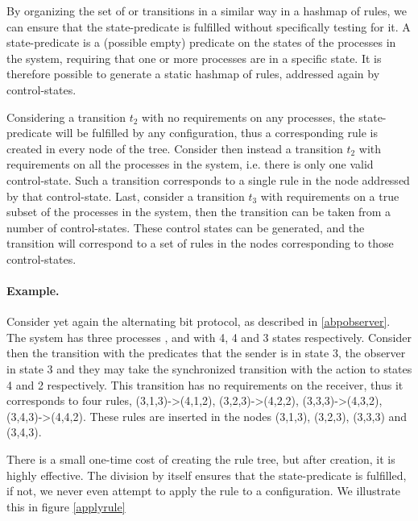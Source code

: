 By organizing the set of  or transitions in a similar way in a hashmap of rules, we can ensure that the state-predicate is fulfilled without specifically testing for it. A state-predicate is a (possible empty) predicate on the states of the processes in the system, requiring that one or more processes are in a specific state. It is therefore possible to generate a static hashmap of rules, addressed again by control-states.

Considering a transition $t_2$ with no requirements on any processes, the state-predicate will be fulfilled by any configuration, thus a corresponding rule is created in every node of the tree. Consider then instead a transition $t_2$ with requirements on all the processes in the system, i.e. there is only one valid control-state. Such a transition corresponds to a single rule in the node addressed by that control-state. Last, consider a transition $t_3$ with requirements on a true subset of the processes in the system, then the transition can be taken from a number of control-states. These control states can be generated, and the transition will correspond to a set of rules in the nodes corresponding to those control-states.

\paragraph{Example.} Consider yet again the alternating bit protocol, as described in \ref{abpobserver}. The system has three processes ,  and  with 4, 4 and 3 states respectively. Consider then the transition with the predicates that the sender is in state 3, the observer in state 3 and they may take the synchronized transition with the action  to states 4 and 2 respectively. This transition has no requirements on the receiver, thus it corresponds to four rules, (3,1,3)->(4,1,2), (3,2,3)->(4,2,2), (3,3,3)->(4,3,2), (3,4,3)->(4,4,2). These rules are inserted in the nodes (3,1,3), (3,2,3), (3,3,3) and (3,4,3).

There is a small one-time cost of creating the rule tree, but after creation, it is highly effective. The division by itself ensures that the state-predicate is fulfilled, if not, we never even attempt to apply the rule to a configuration. We illustrate this in figure \ref{applyrule}

